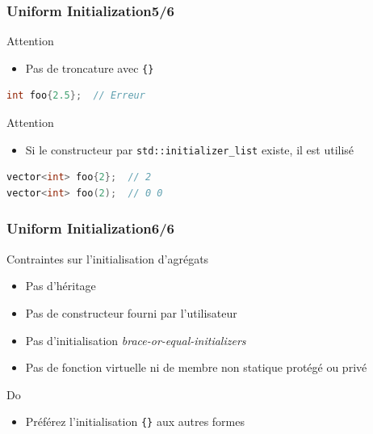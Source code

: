 \documentclass[C++.tex]{subfiles}
\begin{document}
\begin{frame}[fragile]
	\frametitle{Uniform Initialization\titlehfill{}5/6}
	\begin{alertblock}{Attention}
		\begin{itemize}
			\item Pas de troncature avec \lstinline|{}|
		\end{itemize}

		\begin{lstlisting}[language=C++]
int foo{2.5};  // Erreur\end{lstlisting}
	\end{alertblock}

	\pause

	\begin{alertblock}{Attention}
		\begin{itemize}
			\item Si le constructeur par \lstinline|std::initializer_list| existe, il est utilisé
		\end{itemize}

		\begin{lstlisting}[language=C++]
vector<int> foo{2};  // 2
vector<int> foo(2);  // 0 0\end{lstlisting}
	\end{alertblock}
\end{frame}

\begin{frame}[fragile]
	\frametitle{Uniform Initialization\titlehfill{}6/6}
	\begin{alertblock}{Contraintes sur l'initialisation d'agrégats}
		\begin{itemize}
			\item Pas d'héritage
			\item Pas de constructeur fourni par l'utilisateur
			\item Pas d'initialisation \textit{brace-or-equal-initializers}
			\item Pas de fonction virtuelle ni de membre non statique protégé ou privé
		\end{itemize}

	\end{alertblock}

	\begin{exampleblock}{Do}
		\begin{itemize}
			\item Préférez l'initialisation \lstinline|{}| aux autres formes
		\end{itemize}
	\end{exampleblock}
\end{frame}
\end{document}
